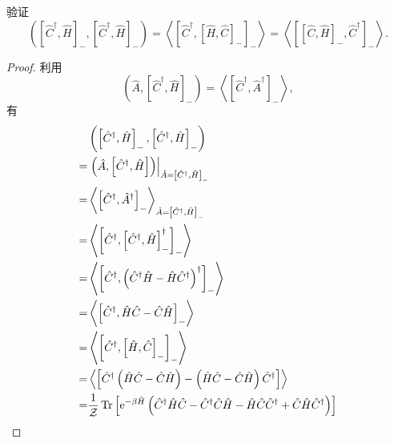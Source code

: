     \begin{question2}{}{}
        验证 
        \begin{equation}
                \left(\left[ \hat{C}^\dagger,\hat{H} \right]_-,\left[ \hat{C}^\dagger,\hat{H} \right]_-\right)=\left\langle \left[ \hat{C}^\dagger,\left[ \hat{H},\hat{C} \right]_- \right]_- \right\rangle   =\left\langle \left[ \left[ \hat{C},\hat{H}\right ]_-,\hat{C}^\dagger \right]_- \right\rangle.
            \end{equation}
    \end{question2}
\begin{proof}
利用
 \begin{equation}
        \left( \hat{A},\left[ \hat{C}^\dagger,\hat{H} \right]_- \right)=\left\langle \left[ \hat{C}^\dagger,\hat{A}^\dagger \right]_- \right\rangle,
        \end{equation}
有
\begin{align}
& \left(\left[ \hat{C}^\dagger,\hat{H} \right]_-,\left[ \hat{C}^\dagger,\hat{H} \right]_-\right)\nonumber\\
=&\left.\left(\hat{A},\left[\hat{C}^{\dagger}, \hat{H}\right]\right)\right|_{\hat{A}=\left[\hat{C}^{\dagger}, \hat{H}\right]_{-}}\nonumber\\
=&\left\langle\left[\hat{C}^{\dagger}, \hat{A}^{\dagger}\right]_{-}\right\rangle_{\hat{A}=\left[\hat{C}^{\dagger}, \hat{H}\right]_{-}} \nonumber\\
=&\left\langle\left[\hat{C}^{\dagger},\left[\hat{C}^{\dagger}, \hat{H}\right]_{-}^{\dagger}\right]_{-}\right\rangle\nonumber\\
=&\left\langle\left[\hat{C}^{\dagger},\left(\hat{C}^{\dagger} \hat{H}-\hat{H} \hat{C}^{\dagger}\right)^{\dagger}\right]_{-}\right\rangle\nonumber \\
=&\left\langle\left[\hat{C}^{\dagger}, \hat{H} \hat{C}-\hat{C} \hat{H}\right]_{-}\right\rangle\nonumber\\
=&\left\langle\left[\hat{C}^{\dagger},\left[\hat{H}, \hat{C}\right]_{-}\right]_{-}\right\rangle \nonumber\\
=&\left\langle\left[\hat{C}^{\dagger}\left(\hat{H} \hat{C}-\hat{C} \hat{H}\right)-\left(\hat{H} \hat{C}-\hat{C} \hat{H}\right) \hat{C}^{\dagger}\right]\right\rangle\nonumber \\
=&\frac{1}{\mathcal{Z}} \operatorname{Tr}\left[\e^{-\beta \hat{H}}\left(\hat{C}^{\dagger} \hat{H} \hat{C}-\hat{C}^{\dagger} \hat{C} \hat{H}-\hat{H} \hat{C} \hat{C}^{\dagger}+\hat{C} \hat{H} \hat{C}^{\dagger}\right)\right] \nonumber\\

\end{align}
\end{proof}
